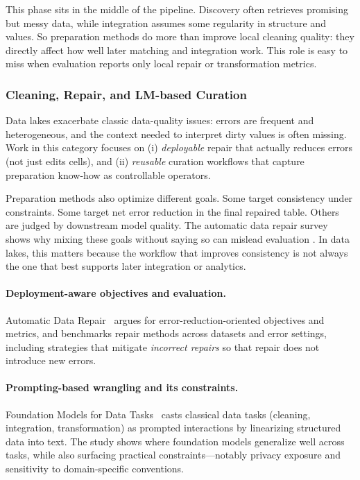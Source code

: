 \documentclass[sigconf,nonacm]{acmart}
\begin{document}
This phase sits in the middle of the pipeline. Discovery often retrieves promising but messy data, while integration assumes some regularity in structure and values. So preparation methods do more than improve local cleaning quality: they directly affect how well later matching and integration work. This role is easy to miss when evaluation reports only local repair or transformation metrics.



\subsubsection{Cleaning, Repair, and LM-based Curation}
Data lakes exacerbate classic data-quality issues: errors are frequent and heterogeneous, and the context needed to
interpret dirty values is often missing. Work in this category focuses on (i) \emph{deployable} repair that
actually reduces errors (not just edits cells), and (ii) \emph{reusable} curation workflows that capture preparation
know-how as controllable operators.

Preparation methods also optimize different goals. Some target consistency under constraints. Some target net error reduction in the final repaired table. Others are judged by downstream model quality. The automatic data repair survey shows why mixing these goals without saying so can mislead evaluation \cite{10.14778/3675034.3675051}. In data lakes, this matters because the workflow that improves consistency is not always the one that best supports later integration or analytics.

\paragraph{Deployment-aware objectives and evaluation.}
Automatic Data Repair~\cite{10.14778/3675034.3675051} argues for error-reduction-oriented objectives and metrics, and benchmarks repair methods across datasets and error settings, including strategies that mitigate \emph{incorrect repairs} so that repair does not introduce new errors.

\paragraph{Prompting-based wrangling and its constraints.}
Foundation Models for Data Tasks~\cite{10.14778/3574245.3574258} casts classical data tasks (cleaning, integration, transformation) as prompted interactions by linearizing structured data into text. The study shows where foundation models generalize well across tasks, while also surfacing practical constraints---notably privacy exposure and sensitivity to domain-specific conventions.
\end{document}
